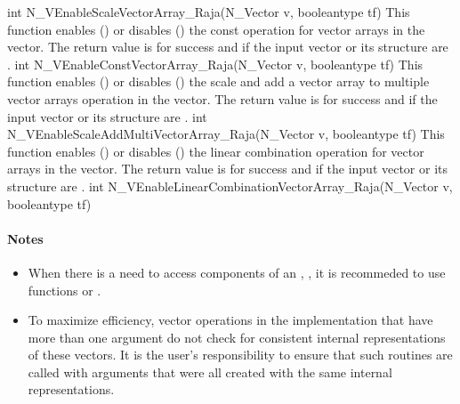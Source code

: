 {
  int N\_VEnableScaleVectorArray\_Raja(N\_Vector v, booleantype tf)
}
{
  This function enables () or disables () the const
  operation for vector arrays in the {\raja} vector. The return value is  for
  success and  if the input vector or its  structure are .
}
{
  int N\_VEnableConstVectorArray\_Raja(N\_Vector v, booleantype tf)
}
{
  This function enables () or disables () the scale and
  add a vector array to multiple vector arrays operation in the {\raja} vector. The
  return value is  for success and  if the input vector or its
   structure are .
}
{
  int N\_VEnableScaleAddMultiVectorArray\_Raja(N\_Vector v, booleantype tf)
}
{
  This function enables () or disables () the linear
  combination operation for vector arrays in the {\raja} vector. The return value
  is  for success and  if the input vector or its  structure
  are .
}
{
  int N\_VEnableLinearCombinationVectorArray\_Raja(N\_Vector v,
  booleantype tf)
}
\paragraph{\bf Notes}

\begin{itemize}

\item
  When there is a need to access components of an , ,
  it is recommeded to use functions  or
  .


\item
  {\warn}To maximize efficiency, vector operations in the {\nvecraja} implementation
  that have more than one  argument do not check for
  consistent internal representations of these vectors. It is the user's
  responsibility to ensure that such routines are called with 
  arguments that were all created with the same internal representations.

\end{itemize}

